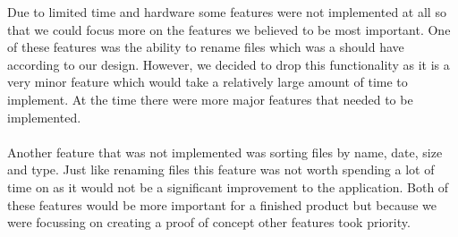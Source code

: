 Due to limited time and hardware some features were not implemented at all so that we could focus more on the features we believed to be most important. One of these features was the ability to rename files which was a should have according to our design. However, we decided to drop this functionality as it is a very minor feature which would take a relatively large amount of time to implement. At the time there were more major features that needed to be implemented.
\\\\
Another feature that was not implemented was sorting files by name, date, size and type. Just like renaming files this feature was not worth spending a lot of time on as it would not be a significant improvement to the application. Both of these features would be more important for a finished product but because we were focussing on creating a proof of concept other features took priority.
